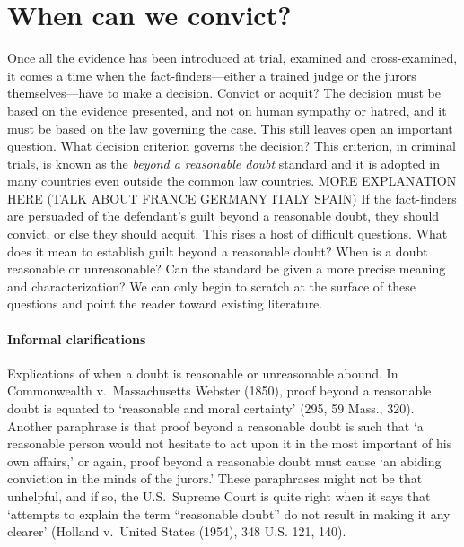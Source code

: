 \documentclass[10pt]{article}
\begin{document}
\section{When can we convict?}



Once all the evidence has been introduced at trial, examined and cross-examined, it comes a time when the fact-finders---either a trained judge or the jurors themselves---have 
to make a decision. Convict or acquit? The decision must be based on the evidence presented, and not on human sympathy or hatred, and it must be based 
on the law governing the case. This still leaves open an important question. What decision criterion governs the decision? This criterion, in criminal trials, is known as the \textit{beyond a reasonable doubt} standard and it is adopted in many countries even outside the common law countries. MORE EXPLANATION HERE (TALK ABOUT FRANCE GERMANY ITALY SPAIN) 
If the fact-finders are persuaded of the defendant's guilt beyond a reasonable doubt, they should convict, or else they should acquit. This rises a host of difficult questions. What does  it mean to establish guilt beyond a reasonable doubt? When is a doubt reasonable or unreasonable? Can the standard be given a more precise meaning and characterization? We can only begin to scratch at the surface of these questions and point the reader toward existing literature. 
  
  \paragraph{Informal clarifications}
  Explications of when a doubt is reasonable or unreasonable abound. In Commonwealth v.\ Massachusetts Webster (1850), 
proof beyond a reasonable doubt is equated to `reasonable and moral certainty' (295, 59 Mass., 320).  Another paraphrase is that proof beyond a reasonable doubt is such that `a reasonable person would not hesitate to act upon it in the most important of his own affairs,' or again, proof beyond a reasonable doubt must cause `an abiding conviction in the minds of the jurors.' These paraphrases might not be that unhelpful, and if so, the U.S.\ Supreme Court is quite right when it says that `attempts to explain the term ``reasonable doubt'' do not result in making it any clearer' (Holland v.\ United States (1954), 348 U.S. 121, 140). 
\end{document}
